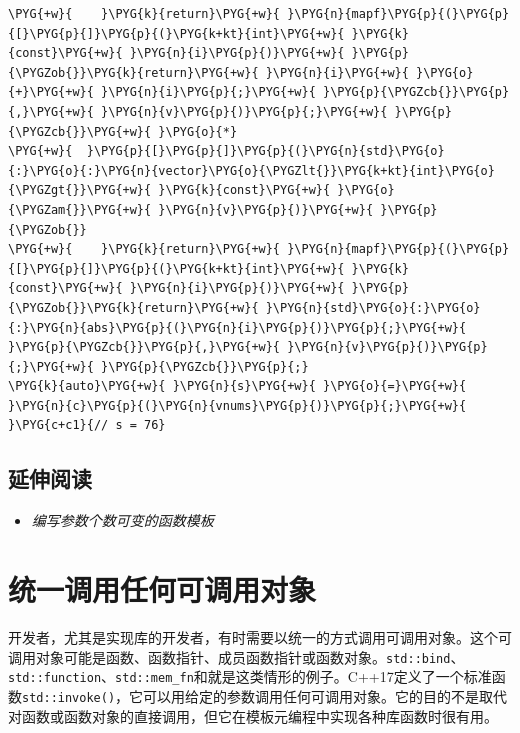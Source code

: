 \begin{codeblockbg}
\begin{Verbatim}[commandchars=\\\{\},breaklines=true,breakanywhere=true,fontsize=\codefont,xleftmargin=17bp]
\PYG{+w}{    }\PYG{k}{return}\PYG{+w}{ }\PYG{n}{mapf}\PYG{p}{(}\PYG{p}{[}\PYG{p}{]}\PYG{p}{(}\PYG{k+kt}{int}\PYG{+w}{ }\PYG{k}{const}\PYG{+w}{ }\PYG{n}{i}\PYG{p}{)}\PYG{+w}{ }\PYG{p}{\PYGZob{}}\PYG{k}{return}\PYG{+w}{ }\PYG{n}{i}\PYG{+w}{ }\PYG{o}{+}\PYG{+w}{ }\PYG{n}{i}\PYG{p}{;}\PYG{+w}{ }\PYG{p}{\PYGZcb{}}\PYG{p}{,}\PYG{+w}{ }\PYG{n}{v}\PYG{p}{)}\PYG{p}{;}\PYG{+w}{ }\PYG{p}{\PYGZcb{}}\PYG{+w}{ }\PYG{o}{*}
\PYG{+w}{  }\PYG{p}{[}\PYG{p}{]}\PYG{p}{(}\PYG{n}{std}\PYG{o}{:}\PYG{o}{:}\PYG{n}{vector}\PYG{o}{\PYGZlt{}}\PYG{k+kt}{int}\PYG{o}{\PYGZgt{}}\PYG{+w}{ }\PYG{k}{const}\PYG{+w}{ }\PYG{o}{\PYGZam{}}\PYG{+w}{ }\PYG{n}{v}\PYG{p}{)}\PYG{+w}{ }\PYG{p}{\PYGZob{}}
\PYG{+w}{    }\PYG{k}{return}\PYG{+w}{ }\PYG{n}{mapf}\PYG{p}{(}\PYG{p}{[}\PYG{p}{]}\PYG{p}{(}\PYG{k+kt}{int}\PYG{+w}{ }\PYG{k}{const}\PYG{+w}{ }\PYG{n}{i}\PYG{p}{)}\PYG{+w}{ }\PYG{p}{\PYGZob{}}\PYG{k}{return}\PYG{+w}{ }\PYG{n}{std}\PYG{o}{:}\PYG{o}{:}\PYG{n}{abs}\PYG{p}{(}\PYG{n}{i}\PYG{p}{)}\PYG{p}{;}\PYG{+w}{ }\PYG{p}{\PYGZcb{}}\PYG{p}{,}\PYG{+w}{ }\PYG{n}{v}\PYG{p}{)}\PYG{p}{;}\PYG{+w}{ }\PYG{p}{\PYGZcb{}}\PYG{p}{;}
\PYG{k}{auto}\PYG{+w}{ }\PYG{n}{s}\PYG{+w}{ }\PYG{o}{=}\PYG{+w}{ }\PYG{n}{c}\PYG{p}{(}\PYG{n}{vnums}\PYG{p}{)}\PYG{p}{;}\PYG{+w}{ }\PYG{c+c1}{// s = 76}
\end{Verbatim}
\end{codeblockbg}



\subsection{延伸阅读}



\begin{itemize}
\item \textit{编写参数个数可变的函数模板}

\end{itemize}



\section{统一调用任何可调用对象}



开发者，尤其是实现库的开发者，有时需要以统一的方式调用可调用对象。这个可调用对象可能是函数、函数指针、成员函数指针或函数对象。\texttt{std::\allowbreak{}bind}、\texttt{std::\allowbreak{}function}、\texttt{std::\allowbreak{}mem\_\allowbreak{}fn}和就是这类情形的例子。C++17定义了一个标准函数\texttt{std::\allowbreak{}invoke()}，它可以用给定的参数调用任何可调用对象。它的目的不是取代对函数或函数对象的直接调用，但它在模板元编程中实现各种库函数时很有用。


